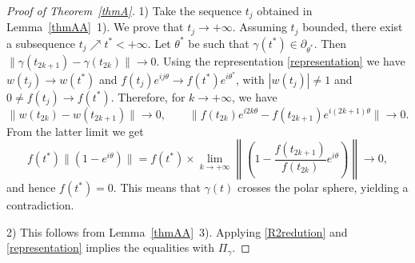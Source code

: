 \documentclass[11pt,a4paper,times]{amsart}
\theoremstyle{plain}
\theoremstyle{definition}
\numberwithin{equation}{section}
\begin{document}
\begin{proof}[Proof of Theorem~\ref{thmA}]
1) Take the sequence $t_j$ obtained in Lemma~\ref{thmAA}{\rm~1)}. We prove that $t_j\to +\infty$.
Assuming $t_j$ bounded, there exist a subsequence $t_{j}\nearrow t^*<+\infty$.
Let $\theta^*$ be such that $\gamma(t^*)\in \partial_{\theta^*}$.
Then $\|\gamma(t_{2k+1})-\gamma(t_{2k})\|\to 0$. 
Using the representation \eqref{representation} we have $w(t_j)\to w(t^*)$ and $f(t_j)e^{ij\theta}\to f(t^*)e^{i\theta^*}$,
with $|w(t_j)|\neq 1$ and $0\neq f(t_j)\to f(t^*)$.
Therefore, for $k\to +\infty$, we have
\[
\|w(t_{2k})-w(t_{2k+1})\|\to 0, \qquad
\|f(t_{2k})e^{i2k\theta}-f(t_{2k+1})e^{i(2k+1)\theta}\|\to 0.
\]
From the latter limit we get
\[
f(t^*)\|(1-e^{i\theta})\|
=f(t^*)\times \lim_{k\to +\infty}\left\|\left(1-\frac{f(t_{2k+1})}{f(t_{2k})}e^{i\theta}\right)\right\|\to 0,
\]
and hence $f(t^*)=0$. This means that $\gamma(t)$ crosses the polar sphere, yielding a contradiction.
\smallskip

2) This follows from Lemma~\ref{thmAA}{\rm~3)}. Applying \eqref{R2redution} and \eqref{representation} implies the equalities with $\Pi_{\gamma}$.
\smallskip


\end{proof}
\end{document}
